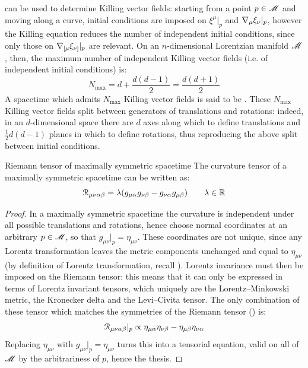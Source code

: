  can be used to determine Killing vector fields: starting from a point $ p \in \mathscr{M} $ and moving along a curve, initial conditions are imposed on $ \xi^\mu \vert_p $ and $ \nabla_\mu \xi_\nu \vert_p $, however the Killing equation reduces the number of independent initial conditions, since only those on $ \nabla_{[\mu} \xi_{\nu]} \vert_p $ are relevant. On an $ n $-dimensional Lorentzian manifold $ \mathscr{M} $, then, the maximum number of independent Killing vector fields (i.e. of independent initial conditions) is:
\begin{equation}
  N_\text{max} = d + \frac{d (d-1)}{2} = \frac{d (d+1)}{2}
\end{equation}
A spacetime which admits $ N_\text{max} $ Killing vector fields is said to be . These $ N_\text{max} $ Killing vector fields split between generators of translations and rotations: indeed, in an $ d $-dimensional space there are $ d $ axes along which to define translations and $ \frac{1}{2} d (d-1) $ planes in which to define rotations, thus reproducing the above split between initial conditions.

\begin{proposition}{Riemann tensor of maximally symmetric spacetime}{}
  The curvature tensor of a maximally symmetric spacetime can be written as:
  \begin{equation}
    \EuScript{R}_{\mu \nu \alpha \beta} = \lambda (g_{\mu \alpha} g_{\nu \beta} - g_{\nu \alpha} g_{\mu \beta})
    \qquad
    \lambda \in \mathbb{R}
  \end{equation}
\end{proposition}

\begin{proofbox}
  \begin{proof}
    In a maximally symmetric spacetime the curvature is independent under all possible translations and rotations, hence choose normal coordinates at an arbitrary $ p \in \mathscr{M} $, so that $ g_{\mu \nu} \vert_p = \eta_{\mu \nu} $. These coordinates are not unique, since any Lorentz transformation leaves the metric components unchanged and equal to $ \eta_{\mu \nu} $ (by definition of Lorentz transformation, recall ). Lorentz invariance must then be imposed on the Riemann tensor: this means that it can only be expressed in terms of Lorentz invariant tensors, which uniquely are the Lorentz--Minkowski metric, the Kronecker delta and the Levi--Civita tensor. The only combination of these tensor which matches the symmetries of the Riemann tensor () is:
    \begin{equation*}
      \EuScript{R}_{\mu \nu \alpha \beta} \vert_p \propto \eta_{\mu \alpha} \eta_{\nu \beta} - \eta_{\mu \beta} \eta_{\nu \alpha}
    \end{equation*}
    Replacing $ \eta_{\mu \nu} $ with $ g_{\mu \nu} \vert_p = \eta_{\mu \nu} $ turns this into a tensorial equation, valid on all of $ \mathscr{M} $ by the arbitrariness of $ p $, hence the thesis.
  \end{proof}
\end{proofbox}

